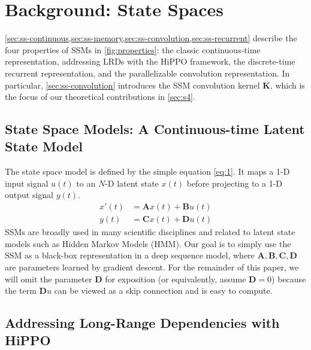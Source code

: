 
\section{Background: State Spaces}
\label{sec:background}

\cref{sec:ss-continuous,sec:ss-memory,sec:ss-convolution,sec:ss-recurrent} describe the four properties of SSMs in \cref{fig:properties}:
the classic continuous-time representation, addressing LRDs with the HiPPO framework, the discrete-time recurrent representation, and the parallelizable convolution representation.
In particular, \cref{sec:ss-convolution} introduces the SSM convolution kernel $\bm{\overline{K}}$,
which is
the focus of our theoretical contributions in \cref{sec:s4}.

\subsection{State Space Models: A Continuous-time Latent State Model}
\label{sec:ss-continuous}

The state space model is defined by the simple equation \eqref{eq:1}.
It maps a 1-D input signal $u(t)$ %
to an \( N \)-D latent state \( x(t) \)
before projecting to a 1-D output signal \( y(t) \).
\begin{equation}
  \label{eq:1}
  \begin{aligned}
    x'(t) &= \bm{A}x(t) + \bm{B}u(t) \\
    y(t) &= \bm{C}x(t) + \bm{D}u(t)
  \end{aligned}
\end{equation}
SSMs are broadly used in many scientific disciplines
and related to latent state models such as Hidden Markov Models (HMM).
Our goal is to simply use the SSM as a black-box representation in a deep sequence model,
where $\bm{A}, \bm{B}, \bm{C}, \bm{D}$ are parameters learned by gradient descent.
For the remainder of this paper, we will omit the parameter \( \bm{D} \) for exposition (or equivalently, assume \( \bm{D} = 0 \)) because the term \( \bm{D}u \) can be viewed as a skip connection and is easy to compute.

\subsection{Addressing Long-Range Dependencies with HiPPO}
\label{sec:ss-memory}



